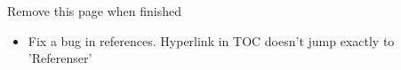 \listoftodos
 Remove this page when finished
\begin{itemize}
    \item Fix a bug in references. Hyperlink in TOC doesn't jump exactly to 'Referenser'
\end{itemize}

\newpage